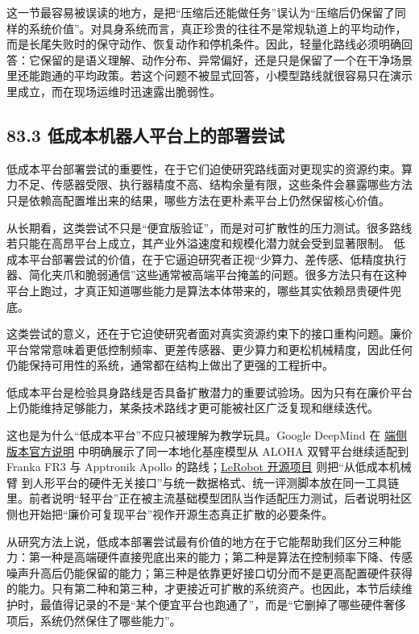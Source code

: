 这一节最容易被误读的地方，是把“压缩后还能做任务”误认为“压缩后仍保留了同样的系统价值”。对具身系统而言，真正珍贵的往往不是常规轨道上的平均动作，而是长尾失败时的保守动作、恢复动作和停机条件。因此，轻量化路线必须明确回答：它保留的是语义理解、动作分布、异常偏好，还是只是保留了一个在干净场景里还能跑通的平均政策。若这个问题不被显式回答，小模型路线就很容易只在演示里成立，而在现场运维时迅速露出脆弱性。

\subsection*{83.3 低成本机器人平台上的部署尝试}


低成本平台部署尝试的重要性，在于它们迫使研究路线面对更现实的资源约束。算力不足、传感器受限、执行器精度不高、结构余量有限，这些条件会暴露哪些方法只是依赖高配置堆出来的结果，哪些方法在更朴素平台上仍然保留核心价值。

从长期看，这类尝试不只是“便宜版验证”，而是对可扩散性的压力测试。很多路线若只能在高昂平台上成立，其产业外溢速度和规模化潜力就会受到显著限制。 低成本平台部署尝试的价值，在于它逼迫研究者正视“少算力、差传感、低精度执行器、简化夹爪和脆弱通信”这些通常被高端平台掩盖的问题。很多方法只有在这种平台上跑过，才真正知道哪些能力是算法本体带来的，哪些其实依赖昂贵硬件兜底。

这类尝试的意义，还在于它迫使研究者面对真实资源约束下的接口重构问题。廉价平台常常意味着更低控制频率、更差传感器、更少算力和更松机械精度，因此任何仍能保持可用性的系统，通常都在结构上做出了更强的工程折中。

低成本平台是检验具身路线是否具备扩散潜力的重要试验场。因为只有在廉价平台上仍能维持足够能力，某条技术路线才更可能被社区广泛复现和继续迭代。

这也是为什么“低成本平台”不应只被理解为教学玩具。Google DeepMind 在 \href{https://deepmind.google/blog/gemini-robotics-on-device-brings-ai-to-local-robotic-devices/}{端侧版本官方说明} 中明确展示了同一本地化基座模型从 ALOHA 双臂平台继续适配到 Franka FR3 与 Apptronik Apollo 的路线；\href{https://github.com/huggingface/lerobot}{LeRobot 开源项目} 则把“从低成本机械臂 \texttt{} 到人形平台的硬件无关接口”与统一数据格式、统一评测脚本放在同一工具链里。前者说明“轻平台”正在被主流基础模型团队当作适配压力测试，后者说明社区侧也开始把“廉价可复现平台”视作开源生态真正扩散的必要条件。

从研究方法上说，低成本部署尝试最有价值的地方在于它能帮助我们区分三种能力：第一种是高端硬件直接兜底出来的能力；第二种是算法在控制频率下降、传感噪声升高后仍能保留的能力；第三种是依靠更好接口切分而不是更高配置硬件获得的能力。只有第二种和第三种，才更接近可扩散的系统资产。也因此，本节后续维护时，最值得记录的不是“某个便宜平台也跑通了”，而是“它删掉了哪些硬件奢侈项后，系统仍然保住了哪些能力”。


